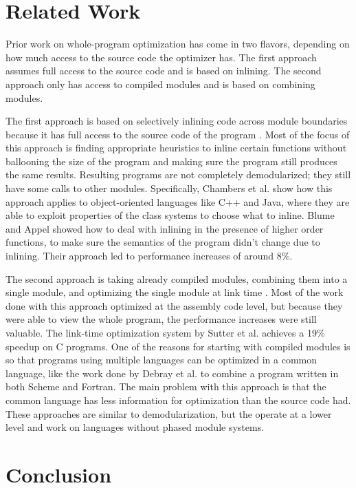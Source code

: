 \documentclass[ms,electronic,letterpaper,lol,lof,lot]{byumsphd}
\begin{document}
\chapter{Related Work}
Prior work on whole-program optimization has come in two flavors, depending on how much access to the source code the optimizer has. The first approach assumes full access to the source code and is based on inlining. The second approach only has access to compiled modules and is based on combining modules.

The first approach is based on selectively inlining code across module boundaries because it has full access to the source code of the program \cite{258960,Chambers96whole-programoptimization}. Most of the focus of this approach is finding appropriate heuristics to inline certain functions without ballooning the size of the program and making sure the program still produces the same results. Resulting programs are not completely demodularized; they still have some calls to other modules. Specifically, Chambers et al. \cite{Chambers96whole-programoptimization} show how this approach applies to object-oriented languages like C++ and Java, where they are able to exploit properties of the class systems to choose what to inline. Blume and Appel \cite{258960} showed how to deal with inlining in the presence of higher order functions, to make sure the semantics of the program didn't change due to inlining. Their approach led to performance increases of around 8\%.

The second approach is taking already compiled modules, combining them into a single module, and optimizing the single module at link time \cite{sutter,727617}. Most of the work done with this approach optimized at the assembly code level, but because they were able to view the whole program, the performance increases were still valuable. 
The link-time optimization system by Sutter et al. \cite{sutter} achieves a 19\% speedup on C programs.
One of the reasons for starting with compiled modules is so that programs using multiple languages can be optimized in a common language, like the work done by Debray et al. \cite{727617} to combine a program written in both Scheme and Fortran. The main problem with this approach is that the common language has less information for optimization than the source code had. 
These approaches are similar to demodularization, but the operate at a lower level and work on languages without phased module systems.

\chapter{Conclusion}
\end{document}
